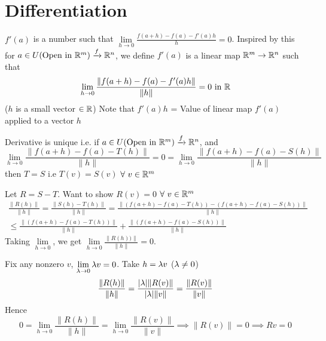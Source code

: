 \section{Differentiation}
$f'(a)$ is a number such that $\lim\limits_{h\to 0}\frac{f(a+h)-f(a)-f'(a)h}{h}=0$. Inspired by this for $a\in U (\text{Open in }\mathbb{R}^m)\xrightarrow{f}\mathbb{R}^n$, we define $f'(a)$ is a linear map $\mathbb{R}^m\to\mathbb{R}^n$ such that $$\lim\limits_{h\to 0}\frac{\|f(a+h)-f(a)-f'(a)h\|}{\|h\|}=0\text{ in }\mathbb{R} $$($h$ is a small vector $\in\mathbb{R}$)
Note that $f'(a)h$ = Value of linear map $f'(a)$ applied to a vector $h$
\begin{Theorem}{}{}
	Derivative is unique i.e. if $a\in U (\text{Open in }\mathbb{R}^m)\xrightarrow{f}\mathbb{R}^n$,  and $$\lim_{h\to 0}\frac{\|f(a+h)-f(a)-T(h)\|}{\|h\|}=0 =\lim_{h\to 0}\frac{\|f(a+h)-f(a)-S(h)\|}{\|h\|}$$then $T=S$ i.e $T(v)=S(v)$ $\forall\ v\in\mathbb{R}^m$
\end{Theorem}
\begin{myproof}
	Let $R=S-T$. Want to show $R(v)=0$ $\forall \ v\in\mathbb{R}^m$ \begin{multline*}
		\frac{\|R(h)\|}{\|h\|}=\frac{\|S(h)-T(h)\|}{\|h\|}=\frac{\|(f(a+h)-f(a)-T(h))-(f(a+h)-f(a)-S(h))\|}{\|h\|} \\
		\leq \frac{\|(f(a+h)-f(a)-T(h))\|}{\|h\|}+\frac{\|(f(a+h)-f(a)-S(h))\|}{\|h\|}
	\end{multline*}Taking $\lim\limits_{h\to 0}$, we get $\lim\limits_{h\to 0}\frac{\|R(h))\|}{\|h\|}=0$.

	Fix any nonzero $v$, $\lim\limits_{\lambda\to 0}\lambda v=0$. Take $h=\lambda v$ ($\lambda\neq 0$)$$\frac{\|R(h)\|}{\|h\|}=\frac{|\lambda|\|R(v)\|}{|\lambda|\|v\|}=\frac{\|R(v)\|}{\|v\|}$$Hence $$0=\lim\limits_{h\to 0}\frac{\|R(h)\|}{\|h\|}=\lim_{h\to 0}\frac{\|R(v)\|}{\|v\|}\implies\|R(v)\|=0\implies Rv=0$$
\end{myproof}
